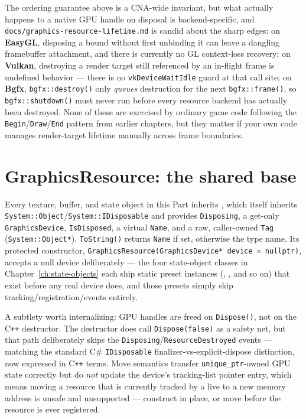 The ordering guarantee above is a CNA-wide invariant, but what actually happens to a native GPU
handle on disposal is backend-specific, and \texttt{docs/graphics-resource-lifetime.md} is
candid about the sharp edges: on \textbf{EasyGL}, disposing a bound 
without first unbinding it can leave a dangling framebuffer attachment, and there is currently
no GL context-loss recovery; on \textbf{Vulkan}, destroying a render target still referenced by
an in-flight frame is undefined behavior --- there is no \texttt{vkDeviceWaitIdle} guard at
that call site; on \textbf{Bgfx}, \texttt{bgfx::destroy()} only \emph{queues} destruction for
the next \texttt{bgfx::frame()}, so \texttt{bgfx::shutdown()} must never run before every
resource backend has actually been destroyed. None of these are exercised by ordinary game code
following the \texttt{Begin}/\texttt{Draw}/\texttt{End} pattern from earlier chapters, but they
matter if your own code manages render-target lifetime manually across frame boundaries.

\section{GraphicsResource: the shared base}

Every texture, buffer, and state object in this Part inherits ,
which itself inherits \texttt{System::Object}/\texttt{System::IDisposable} and provides
\texttt{Disposing}, a get-only \texttt{GraphicsDevice}, \texttt{IsDisposed}, a virtual
\texttt{Name}, and a raw, caller-owned \texttt{Tag} (\texttt{System::Object*}).
\texttt{ToString()} returns \texttt{Name} if set, otherwise the type name. Its protected
constructor, \texttt{GraphicsResource(GraphicsDevice* device = nullptr)}, accepts a null device
deliberately --- the four state-object classes in Chapter~\ref{ch:state-objects} each ship
static preset instances (, ,
and so on) that exist before any real device does, and those presets simply skip
tracking/registration/events entirely.

A subtlety worth internalizing: GPU handles are freed on \texttt{Dispose()}, not on the
C\texttt{++} destructor. The destructor does call \texttt{Dispose(false)} as a safety net, but
that path deliberately skips the \texttt{Disposing}/\texttt{ResourceDestroyed} events ---
matching the standard C\# \texttt{IDisposable} finalizer-vs-explicit-dispose distinction, now
expressed in C\texttt{++} terms. Move semantics transfer \texttt{unique\_ptr}-owned GPU state
correctly but do \emph{not} update the device's tracking-list pointer entry, which means moving
a resource that is currently tracked by a live  to a new memory
address is unsafe and unsupported --- construct in place, or move before the resource is ever
registered.

